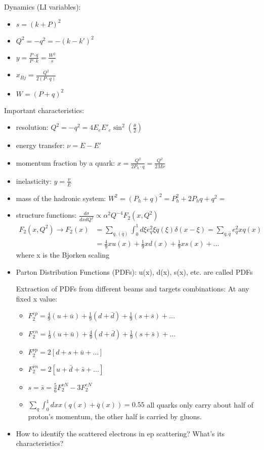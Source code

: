 Dynamics (LI variables):
\begin{itemize}
    \item $s = (k + P)^2$
    \item $Q^2 = -q^2 = -(k-k')^2$ 
    \item $y = \frac{P\cdot q}{P\cdot k} = \frac{W^2}{s}$
    \item $x_{Bj} = \frac{Q^2}{2(P\cdot q)} $
    \item $W = (P + q)^2$
\end{itemize}
Important characteristics:
\begin{itemize}
    \item resolution: $Q^2 = -q^2 = 4E_eE'_e\sin^2\left(\frac{\theta}{2}\right)$
    \item energy transfer: $\nu = E - E'$
    \item momentum fraction by a quark: $x = \frac{Q^2}{2P_h\cdot q} = \frac{Q^2}{2M\nu}$
    \item inelasticity: $y = \frac{\nu}{E}$
    \item mass of the hadronic system: $W^2 = (P_h + q)^2 = P_h^2 + 2P_hq + q^2 = $ 
    \item structure functions: $\frac{d\sigma}{dx dQ^2} \propto \alpha^2 Q^{-4}F_2(x, Q^2)$
	\begin{equation*}
	    \begin{aligned}
		F_2(x, Q^2) \rightarrow F_2(x) 
		&= \sum_{q, (\bar{q})} \int_0^1 d\xi e_q^2 \xi q(\xi)\delta(x-\xi) 
		= \sum_{q, \bar{q}} e_q^2 x q(x)    \\
		&= \frac{4}{9}xu(x) + \frac{1}{9}xd(x) + \frac{1}{9}xs(x) + \dots
	    \end{aligned}
	\end{equation*}
	where x is the Bjorken scaling
    \item Parton Distribution Functions (PDFs): u(x), d(x), s(x), etc. are called
	PDFs

	Extraction of PDFs from different beams and targets combinations:
	At any fixed x value:
	\begin{itemize}
	    \item $F_2^{ep} = \frac{4}{9}(u + \bar{u}) + \frac{1}{9}(d + \bar{d}) 
		    + \frac{1}{9}(s + \bar{s}) + \dots$
	    \item $F_2^{en} = \frac{1}{9}(u + \bar{u}) + \frac{4}{9}(d + \bar{d}) 
		    + \frac{1}{9}(s + \bar{s}) + \dots$
		\item $F_2^{\nu p} = 2[d + s + \bar{u} + \dots]$
		\item $F_2^{\nu n} = 2[u + \bar{d} + \bar{s} + \dots]$
		\item $s = \bar{s} = \frac{5}{6}F_2^{\nu N} - 3 F_2^{eN}$
		\item $\sum_q\int_0^1 dx x(q(x) + \bar{q}(x)) = 0.55$ all quarks
		    only carry about half of proton's momentum, the other half
		    is carried by gluons.
	\end{itemize}
	\item How to identify the scattered electrons in ep scattering? What's 
	    its characteristics?
\end{itemize}


